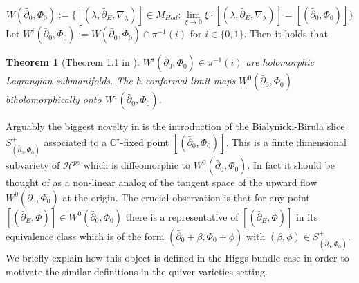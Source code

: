 \documentclass[12pt,oneside,reqno]{amsart}
\newtheorem{theorem}{Theorem}
\theoremstyle{definition}
\numberwithin{equation}{section}
\numberwithin{theorem}{section}
\newcommand{\C}{\mathbb{C}}
\newcommand{\pa}{\partial}
\begin{document}
%
\begin{equation*}
    W(\bar\pa_0, \Phi_0):= \{ [(\lambda, \bar\pa_E,\nabla_{\lambda})]\in M_{Hod}: \lim\limits_{\xi\to 0} \xi\cdot [(\lambda, \bar\pa_E,\nabla_{\lambda})] = [(\bar\pa_0, \Phi_0)]\}
\end{equation*}
%
Let $W^i(\bar\pa_0, \Phi_0):= W(\bar\pa_0, \Phi_0)\cap\pi^{-1}(i)$ for $i\in\{0,1\}$. Then it holds that
%
\begin{theorem}[Theorem 1.1 in \cite{CW}]\label{CWtheorem}
    $W^i(\bar\pa_0, \Phi_0)\in \pi^{-1}(i)$ are holomorphic Lagrangian submanifolds. The $\hbar$-conformal limit maps $W^0(\bar\pa_0, \Phi_0)$ biholomorphically onto $W^1(\bar\pa_0, \Phi_0)$.
\end{theorem}
%
Arguably the biggest novelty in \cite{CW} is the introduction of the Bialynicki-Birula slice $S^+_{(\bar\pa_0,\Phi_0)}$ associated to a $\C^{\star}$-fixed point $[(\bar\pa_0,\Phi_0)]$. This is a finite dimensional subvariety of $\mathcal H^{ps}$ which is diffeomorphic to $W^0(\bar\pa_0,\Phi_0)$. In fact it should be thought of as a non-linear analog of the tangent space of the upward flow $W^0(\bar\pa_0,\Phi_0)$ at the origin. The crucial observation is that for any point $[(\bar\pa_E,\Phi)]\in W^0(\bar\pa_0,\Phi_0)$ there is a representative of $[(\bar\pa_E,\Phi)]$ in its equivalence class which is of the form $(\bar\pa_0+\beta,\Phi_0+\phi)$ with $(\beta,\phi)\in S^+_{(\bar\pa_0,\Phi_0)}$. We briefly explain how this object is defined in the Higgs bundle case in order to motivate the similar definitions in the quiver varieties setting. 
\end{document}
